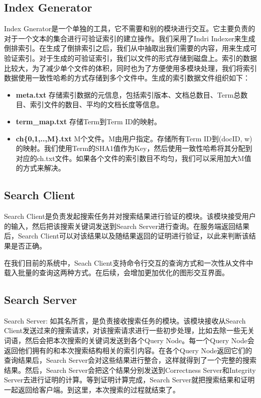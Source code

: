 \subsection{Index Generator}
Index Gnerator是一个单独的工具，它不需要和别的模块进行交互。它主要负责的对于一个文本的集合进行可验证索引的建立操作。我们采用了Indri Indexer来生成倒排索引。在生成了倒排索引之后，我们从中抽取出我们需要的内容，用来生成可验证索引。对于生成的可验证索引，我们以文件的形式存储到磁盘上。索引的数据比较大，为了减少单个文件的体积，同时也为了方便使用多模块处理，我们将索引数据使用一致性哈希的方式存储到多个文件中。生成的索引数据文件组织如下：
\begin{itemize}
\item \textbf{meta.txt} 存储索引数据的元信息，包括索引版本、文档总数目、Term总数目、索引文件的数目、平均的文档长度等信息。
\item \textbf{term\_map.txt} 存储Term到Term ID的映射。
\item \textbf{ch\{0,1,..,M\}.txt} M个文件。M由用户指定。存储所有Term ID到(docID, w)的映射。我们使用Term的SHA1值作为Key，然后使用一致性哈希将其分配到对应的ch.txt文件。如果各个文件的索引数目不均匀，我们可以采用加大M值的方式来解决。
\end{itemize}

\subsection{Search Client}
Search Client是负责发起搜索任务并对搜索结果进行验证的模块。该模块接受用户的输入，然后把该搜索关键词发送到Search Server进行查询。在服务端返回结果后，Search Client可以对该结果以及随结果返回的证明进行验证，以此来判断该结果是否正确。

在我们目前的系统中，Seach Client支持命令行交互的查询方式和一次性从文件中载入批量的查询这两种方式。在后续，会增加更加优化的图形交互界面。

\subsection{Search Server}
Search Server: 如其名所言，是负责接收搜索任务的模块。该模块接收从Search Client发送过来的搜索请求，对该搜索请求进行一些初步处理，比如去除一些无关词语，然后会把本次搜索的关键词发送到各个Query Node。每一个Query Node会返回他们拥有的和本次搜索结构相关的索引内容。在各个Query Node返回它们的查询结果后，Search Server会对这些结果进行整合，这样就得到了一个完整的搜索结果。然后，Search Server会把这个结果分别发送到Correctness Server和Integrity Server去进行证明的计算。等到证明计算完成，Search Server就把搜索结果和证明一起返回给客户端。到这里，本次搜索的过程就结束了。

